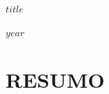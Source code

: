 \thispagestyle{empty}

\vspace*{6.0cm}

\begin{center}
    \textbf{$title$}
\end{center}

\vspace{8.0cm}

\begin{center}
$year$
\end{center}

\newpage
\pagestyle{fancy}

\newcommand{\resumo}{%
\titleformat{\section}[block]{\bfseries\filcenter}{}{1em}{}
}
\resumo

\pagestyle{fancy}

\section*{RESUMO}

